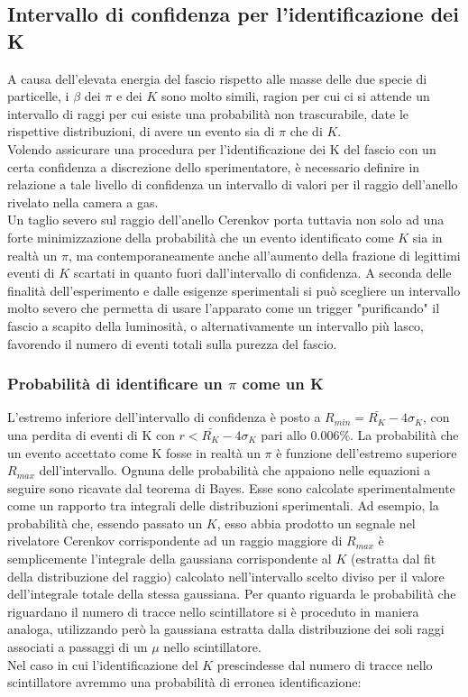\documentclass[8pt]{extarticle}
\begin{document}
\subsection{Intervallo di confidenza per l'identificazione dei K}
A causa dell'elevata energia del fascio rispetto alle masse delle due specie di particelle, i $\beta$ dei $\pi$ e dei $K$ sono molto simili, ragion per cui ci si attende un intervallo di raggi per cui esiste una probabilità non trascurabile, date le rispettive distribuzioni, di avere un evento sia di $\pi$ che di $K$.\\
Volendo assicurare una procedura per l'identificazione dei K del fascio con un certa confidenza a discrezione dello sperimentatore, è necessario definire in relazione a tale livello di confidenza un intervallo di valori per il raggio dell'anello rivelato nella camera a gas.\\
Un taglio severo sul raggio dell'anello Cerenkov porta tuttavia non solo ad una forte minimizzazione della probabilità che un evento identificato come $K$ sia in realtà un $\pi$, ma contemporaneamente anche all'aumento della frazione di legittimi eventi di $K$ scartati in quanto fuori dall'intervallo di confidenza. A seconda delle finalità dell'esperimento e dalle esigenze sperimentali si può scegliere un intervallo molto severo che permetta di usare l'apparato come un trigger "purificando" il fascio a scapito della luminosità, o alternativamente un intervallo più lasco, favorendo il numero di eventi totali sulla purezza del fascio.

\subsubsection{Probabilità di identificare un $\pi$ come un K} \label{subsub:mis}
L'estremo inferiore dell'intervallo di confidenza è posto a $R_{min}=\bar{R_K}-4\sigma_K$, con una perdita di eventi di K con $r<\bar{R_K}-4\sigma_K$ pari allo 0.006\%. La probabilità che un evento accettato come K fosse in realtà un $\pi$ è funzione dell'estremo superiore $R_{max}$ dell'intervallo. Ognuna delle probabilità che appaiono nelle equazioni a seguire sono ricavate dal teorema di Bayes. Esse sono calcolate sperimentalmente come un rapporto tra integrali delle distribuzioni sperimentali. Ad esempio, la probabilità che, essendo passato un $K$, esso abbia prodotto un segnale nel rivelatore Cerenkov corrispondente ad un raggio maggiore di $R_{max}$ è semplicemente l'integrale della gaussiana corrispondente al $K$ (estratta dal fit della distribuzione del raggio) calcolato nell'intervallo scelto diviso per il valore dell'integrale totale della stessa gaussiana. Per quanto riguarda le probabilità che riguardano il numero di tracce nello scintillatore si è proceduto in maniera analoga, utilizzando però la gaussiana estratta dalla distribuzione dei soli raggi associati a passaggi di un $\mu$ nello scintillatore. \\
Nel caso in cui l'identificazione del $K$ prescindesse dal numero di tracce nello scintillatore avremmo una probabilità di erronea identificazione: \\
\end{document}
